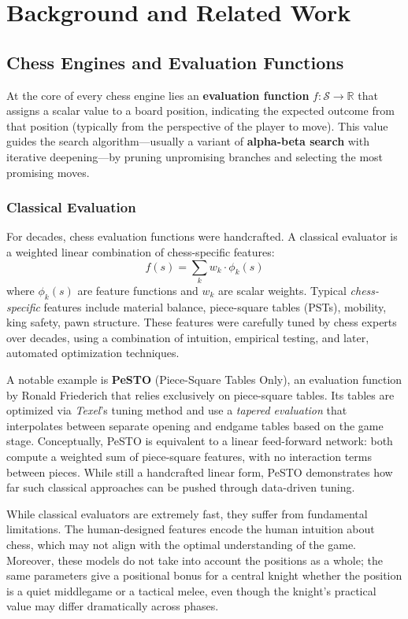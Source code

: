 \chapter{Background and Related Work}\label{ch:background}

\section{Chess Engines and Evaluation Functions}\label{sec:engines}

At the core of every chess engine lies an \textbf{evaluation function} \(f: \mathcal{S} \rightarrow \mathbb{R}\) that assigns a scalar value to a board position, indicating the expected outcome from that position (typically from the perspective of the player to move). This value guides the search algorithm---usually a variant of \textbf{alpha-beta search} with iterative deepening---by pruning unpromising branches and selecting the most promising moves.

\subsection{Classical Evaluation}\label{sec:classical-eval}

For decades, chess evaluation functions were handcrafted. A classical evaluator is a weighted linear combination of chess-specific features:
\[
f(s) = \sum_{k} w_k \cdot \phi_k(s)
\]
where \(\phi_k(s)\) are feature functions and \(w_k\) are scalar weights. Typical \emph{chess-specific} features include material balance, piece-square tables (PSTs), mobility, king safety, pawn structure. These features were carefully tuned by chess experts over decades, using a combination of intuition, empirical testing, and later, automated optimization techniques.

A notable example is \textbf{PeSTO} (Piece-Square Tables Only), an evaluation function by Ronald Friederich that relies exclusively on piece-square tables. Its tables are optimized via \emph{Texel}'s tuning method and use a \emph{tapered evaluation} that interpolates between separate opening and endgame tables based on the game stage. Conceptually, PeSTO is equivalent to a linear feed-forward network: both compute a weighted sum of piece-square features, with no interaction terms between pieces. While still a handcrafted linear form, PeSTO demonstrates how far such classical approaches can be pushed through data-driven tuning.

While classical evaluators are extremely fast, they suffer from fundamental limitations. The human-designed features encode the human intuition about chess, which may not align with the optimal understanding of the game. Moreover, these models do not take into account the positions as a whole; the same parameters give a positional bonus for a central knight whether the position is a quiet middlegame or a tactical melee, even though the knight's practical value may differ dramatically across phases.

